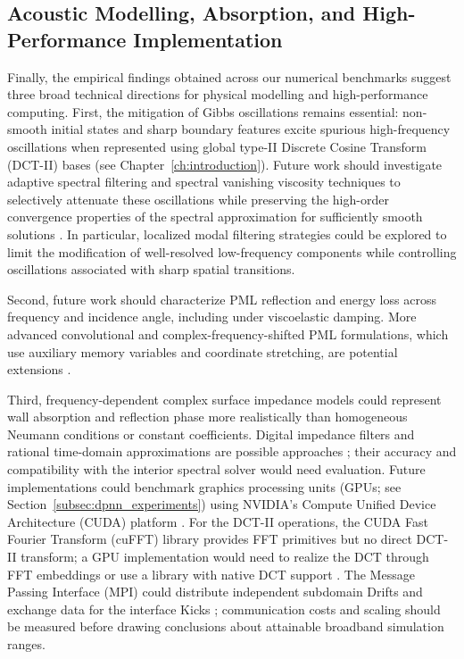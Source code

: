 \documentclass{Configuration_Files/PoliMi3i_thesis}
\newif\ifshowthesischanges
\DeclareRobustCommand{\thesischange}[2]{%
    \ifshowthesischanges
        \textcolor{#1}{#2}%
    \else
        #2%
    \fi
}
\def\thesischange#1#2{#2}%
\begin{document}
\subsection{\thesischange{red}{Acoustic Modelling, Absorption, and High-Performance Implementation}}

\thesischange{red}{Finally, the empirical findings obtained across our numerical benchmarks suggest three broad technical directions for physical modelling and high-performance computing. First, the mitigation of Gibbs oscillations remains essential: non-smooth initial states and sharp boundary features excite spurious high-frequency oscillations when represented using global type-II Discrete Cosine Transform (DCT-II) bases (see Chapter~\ref{ch:introduction}). Future work should investigate adaptive spectral filtering and spectral vanishing viscosity techniques to selectively attenuate these oscillations while preserving the high-order convergence properties of the spectral approximation for sufficiently smooth solutions \citep{tadmor_spectral_1989,gottlieb_gibbs_1997}. In particular, localized modal filtering strategies could be explored to limit the modification of well-resolved low-frequency components while controlling oscillations associated with sharp spatial transitions.}

\thesischange{red}{Second, future work should characterize PML reflection and energy loss across frequency and incidence angle, including under viscoelastic damping. More advanced convolutional and complex-frequency-shifted PML formulations, which use auxiliary memory variables and coordinate stretching, are potential extensions \citep{li_bou_matar_cpml_2010,martin_komatitsch_cpml_2009,gao_cfs_pml_2015}.}

\thesischange{red}{Third, frequency-dependent complex surface impedance models could represent wall absorption and reflection phase more realistically than homogeneous Neumann conditions or constant coefficients. Digital impedance filters and rational time-domain approximations are possible approaches \citep{kowalczyk_vanwalstijn_2008,mondet_absorption_impedance_2020}; their accuracy and compatibility with the interior spectral solver would need evaluation. Future implementations could benchmark graphics processing units (GPUs; see Section~\ref{subsec:dpnn_experiments}) using NVIDIA's Compute Unified Device Architecture (CUDA) platform \citep{nvidia_cuda_programming_guide}. For the DCT-II operations, the CUDA Fast Fourier Transform (cuFFT) library provides FFT primitives but no direct DCT-II transform; a GPU implementation would need to realize the DCT through FFT embeddings or use a library with native DCT support \citep{nvidia_cufft_library}. The Message Passing Interface (MPI) could distribute independent subdomain Drifts and exchange data for the interface Kicks \citep{mpi_forum_standard_50}; communication costs and scaling should be measured before drawing conclusions about attainable broadband simulation ranges.}
\end{document}
